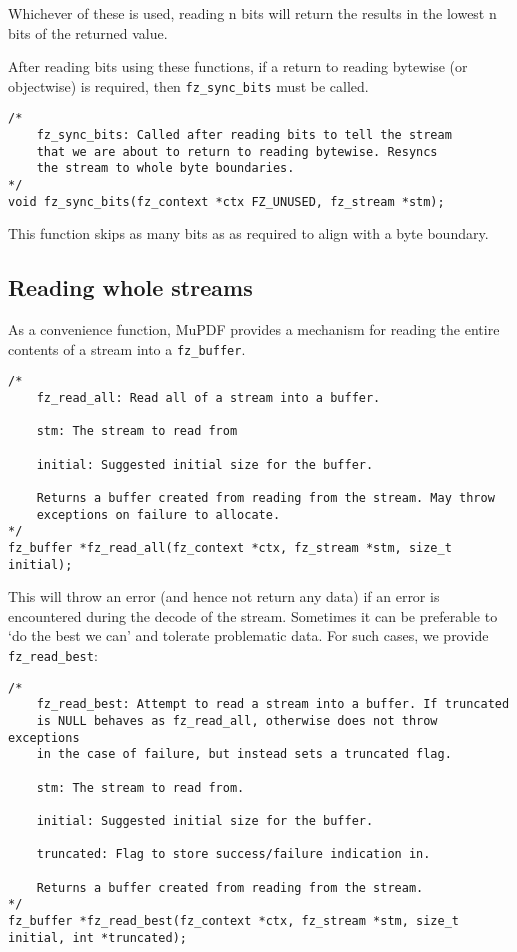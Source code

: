 \documentclass[oneside]{book}
\begin{document}
Whichever of these is used, reading n bits will return the results in the lowest n bits of the returned value.

After reading bits using these functions, if a return to reading bytewise (or objectwise) is required, then \texttt{fz\_sync\_bits} must be called.

\begin{lstlisting}
/*
	fz_sync_bits: Called after reading bits to tell the stream
	that we are about to return to reading bytewise. Resyncs
	the stream to whole byte boundaries.
*/
void fz_sync_bits(fz_context *ctx FZ_UNUSED, fz_stream *stm);
\end{lstlisting}

This function skips as many bits as as required to align with a byte boundary.

\subsection{Reading whole streams}

As a convenience function, MuPDF provides a mechanism for reading the entire contents of a stream into a \texttt{fz\_buffer}.

\begin{lstlisting}
/*
	fz_read_all: Read all of a stream into a buffer.

	stm: The stream to read from

	initial: Suggested initial size for the buffer.

	Returns a buffer created from reading from the stream. May throw
	exceptions on failure to allocate.
*/
fz_buffer *fz_read_all(fz_context *ctx, fz_stream *stm, size_t initial);
\end{lstlisting}

This will throw an error (and hence not return any data) if an error is encountered during the decode of the stream. Sometimes it can be preferable to `do the best we can' and tolerate problematic data. For such cases, we provide \texttt{fz\_read\_best}:

\begin{lstlisting}
/*
	fz_read_best: Attempt to read a stream into a buffer. If truncated
	is NULL behaves as fz_read_all, otherwise does not throw exceptions
	in the case of failure, but instead sets a truncated flag.

	stm: The stream to read from.

	initial: Suggested initial size for the buffer.

	truncated: Flag to store success/failure indication in.

	Returns a buffer created from reading from the stream.
*/
fz_buffer *fz_read_best(fz_context *ctx, fz_stream *stm, size_t initial, int *truncated);
\end{lstlisting}
\end{document}
